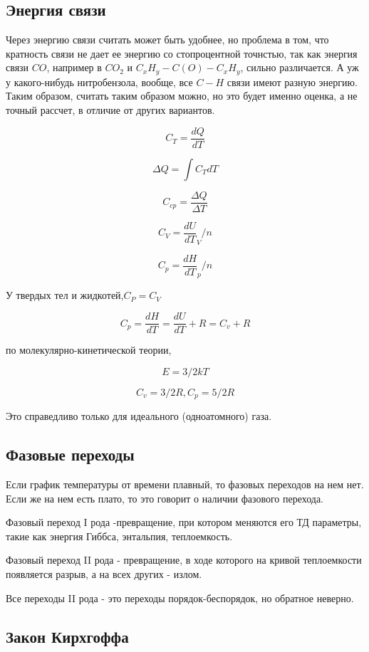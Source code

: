 \documentclass[11pt]{article}
\begin{document}
\subsection{Энергия связи}

Через энергию связи считать может быть удобнее, но проблема в том, что кратность связи не дает ее энергию со стопроцентной точнстью, так как энергия связи $CO$, например в $CO_2$ и   $C_xH_y-C(O)-C_xH_y$, сильно различается. А уж у какого-нибудь нитробензола, вообще, все $C-H$ связи имеют разную энергию. Таким образом, считать таким образом можно, но это будет именно оценка, а не точный рассчет, в отличие от других вариантов. 

$$C_T = \frac{dQ}{dT}$$

$$\Delta Q = \int C_TdT$$

$$C_{cp} = \frac {\Delta Q}{\Delta T}$$

$$C_V = \frac{dU}{dT}_V/n$$

$$C_p = \frac{dH}{dT}_p/n$$

У твердых тел и жидкотей,$C_P = C_V$

$$C_p = \frac{dH}{dT} = \frac{dU}{dT} + R = C_v + R$$


по молекулярно-кинетической теории, 

$$E = 3/2kT$$

$$C_v = 3/2R, C_p = 5/2R$$

Это справедливо только для идеального (одноатомного) газа.

\subsection{Фазовые переходы}

Если график температуры от времени плавный, то фазовых переходов на нем нет. Если же на нем есть плато, то это говорит о наличии фазового перехода.

Фазовый переход I рода -превращение, при котором меняются его ТД параметры, такие как энергия Гиббса, энтальпия, теплоемкость.

Фазовый переход II рода - превращение, в ходе которого на кривой теплоемкости появляется разрыв, а на всех других - излом.

Все переходы II рода - это переходы порядок-беспорядок, но обратное неверно.

\subsection{Закон Кирхгоффа}
\end{document}
